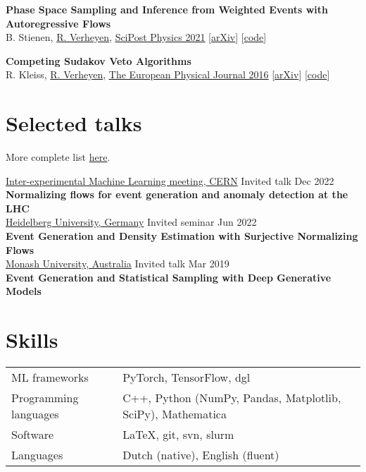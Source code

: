 \documentclass[a4paper,12pt]{article}
\begin{document}
\textbf{Phase Space Sampling and Inference from Weighted Events with Autoregressive Flows} \\
B. Stienen, \underline{R. Verheyen}, 
\href{https://scipost.org/10.21468/SciPostPhys.10.2.038}{\underline{SciPost Physics 2021}} [\href{https://arxiv.org/pdf/2011.13445.pdf}{arXiv}] [\href{https://github.com/rbvh/PhaseSpaceAutoregressiveFlow}{code}]

\textbf{Competing Sudakov Veto Algorithms} \\
R. Kleiss, \underline{R. Verheyen},
\href{https://link.springer.com/article/10.1140/epjc/s10052-016-4231-5}{\underline{The European Physical Journal 2016}} [\href{https://arxiv.org/pdf/1605.09246.pdf}{arXiv}] [\href{https://github.com/rbvh/Veto-Algorithm-Toy-Shower}{code}]


\section{Selected talks}
More complete list \href{https://rbvh.github.io/}{here}.

\underline{Inter-experimental Machine Learning meeting, CERN} Invited talk \hfill Dec 2022 \\[1.75pt]
\textbf{Normalizing flows for event generation and anomaly detection at the LHC} \\[3.5pt]
\underline{Heidelberg University, Germany} Invited seminar \hfill Jun 2022 \\[1.75pt]
\textbf{Event Generation and Density Estimation with Surjective Normalizing Flows}  \\[3.5pt]
\underline{Monash University, Australia} Invited talk \hfill Mar 2019 \\[1.75pt]
\textbf{Event Generation and Statistical Sampling with Deep Generative Models} 

\section{Skills}
\begin{tabularx}{\linewidth}{@{}l X@{}}
ML frameworks & \normalsize{PyTorch, TensorFlow, dgl} \\
Programming languages & \normalsize{C++, Python (NumPy, Pandas, Matplotlib, SciPy), Mathematica} \\
Software & \normalsize{LaTeX, git, svn, slurm}  \\
Languages & \normalsize{Dutch (native), English (fluent)}
\end{tabularx}

\vfill
{}
\end{document}
